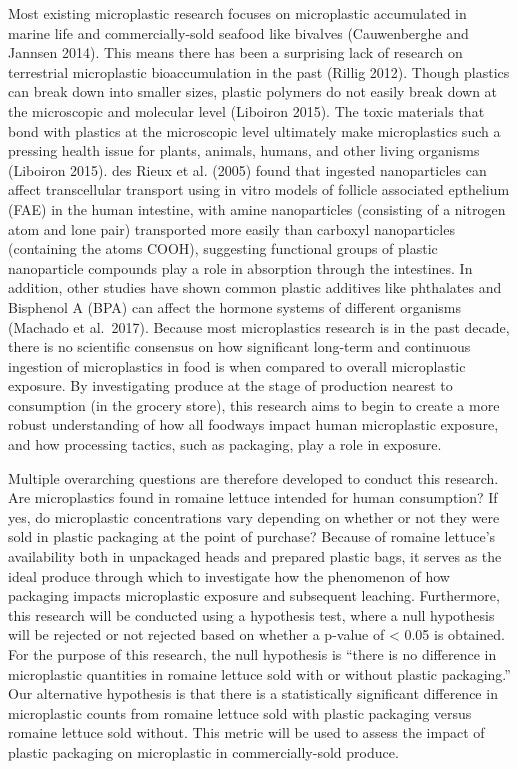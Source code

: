 \documentclass[]{article}
\begin{document}
Most existing microplastic research focuses on microplastic accumulated
in marine life and commercially-sold seafood like bivalves (Cauwenberghe
and Jannsen 2014). This means there has been a surprising lack of
research on terrestrial microplastic bioaccumulation in the past (Rillig
2012). Though plastics can break down into smaller sizes, plastic
polymers do not easily break down at the microscopic and molecular level
(Liboiron 2015). The toxic materials that bond with plastics at the
microscopic level ultimately make microplastics such a pressing health
issue for plants, animals, humans, and other living organisms (Liboiron
2015). des Rieux et al. (2005) found that ingested nanoparticles can
affect transcellular transport using in vitro models of follicle
associated epthelium (FAE) in the human intestine, with amine
nanoparticles (consisting of a nitrogen atom and lone pair) transported
more easily than carboxyl nanoparticles (containing the atoms COOH),
suggesting functional groups of plastic nanoparticle compounds play a
role in absorption through the intestines. In addition, other studies
have shown common plastic additives like phthalates and Bisphenol A
(BPA) can affect the hormone systems of different organisms (Machado et
al.~2017). Because most microplastics research is in the past decade,
there is no scientific consensus on how significant long-term and
continuous ingestion of microplastics in food is when compared to
overall microplastic exposure. By investigating produce at the stage of
production nearest to consumption (in the grocery store), this research
aims to begin to create a more robust understanding of how all foodways
impact human microplastic exposure, and how processing tactics, such as
packaging, play a role in exposure.

Multiple overarching questions are therefore developed to conduct this
research. Are microplastics found in romaine lettuce intended for human
consumption? If yes, do microplastic concentrations vary depending on
whether or not they were sold in plastic packaging at the point of
purchase? Because of romaine lettuce's availability both in unpackaged
heads and prepared plastic bags, it serves as the ideal produce through
which to investigate how the phenomenon of how packaging impacts
microplastic exposure and subsequent leaching. Furthermore, this
research will be conducted using a hypothesis test, where a null
hypothesis will be rejected or not rejected based on whether a p-value
of \textless{} 0.05 is obtained. For the purpose of this research, the
null hypothesis is ``there is no difference in microplastic quantities
in romaine lettuce sold with or without plastic packaging.'' Our
alternative hypothesis is that there is a statistically significant
difference in microplastic counts from romaine lettuce sold with plastic
packaging versus romaine lettuce sold without. This metric will be used
to assess the impact of plastic packaging on microplastic in
commercially-sold produce.
\end{document}

